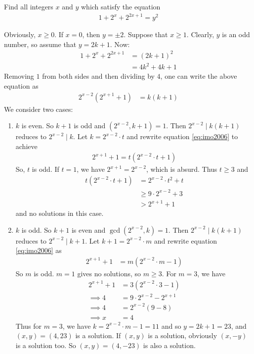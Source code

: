 \begin{problem}[IMO 2006]
	Find all integers $x$ and $y$ which satisfy the equation
		\begin{align*}
			1 + 2^x + 2^{2x + 1} = y^2
		\end{align*}
\end{problem}

\begin{solution}
	Obviously, $x \ge 0$. If $x = 0$, then $y = \pm 2$. Suppose that $x \ge 1$. Clearly, $y$ is an odd number, so assume that $y = 2k + 1$. Now:
		\begin{align*}
			1 + 2^x + 2^{2x + 1}
				& = (2k + 1)^2\\
				& = 4k^2 + 4k + 1
		\end{align*}
	Removing $1$ from both sides and then dividing by $4$, one can write the above equation as
		\begin{align}\label{eq:imo2006}
			2^{x - 2}(2^{x + 1} + 1)
				& = k(k + 1)
		\end{align}
	We consider two cases:
	\begin{enumerate}
		\item $k$ is even. So $k + 1$ is odd and $(2^{x - 2}, k + 1) = 1$. Then $2^{x - 2}\mid k(k + 1)$ reduces to $2^{x - 2}\mid k$. Let $k = 2^{x - 2} \cdot t$ and rewrite equation \eqref{eq:imo2006} to achieve
			\begin{align*}
				2^{x + 1} + 1 = t(2^{x - 2} \cdot t + 1)
			\end{align*}
		So, $t$ is odd. If $t = 1$, we have $2^{x + 1} = 2^{x - 2}$, which is absurd. Thus $t \ge 3$ and
			\begin{align*}
				t(2^{x - 2} \cdot t + 1)
					& = 2^{x - 2} \cdot t^2 + t\\
					& \ge 9 \cdot 2^{x - 2} + 3\\
					& > 2^{x + 1} + 1
			\end{align*}
		and no solutions in this case.

		\item $k$ is odd. So $k + 1$ is even and $\gcd(2^{x - 2}, k) = 1$. Then $2^{x - 2}\mid k(k + 1)$ reduces to $2^{x - 2}\mid k+1$. Let $k+1 = 2^{x - 2} \cdot m$ and rewrite equation \eqref{eq:imo2006} as
			\begin{align*}
				2^{x + 1} + 1
					& = m(2^{x - 2} \cdot m - 1)
			\end{align*}
		So $m$ is odd. $m = 1$ gives no solutions, so $m \ge 3$. For $m = 3$, we have
			\begin{align*}
				2^{x + 1} + 1
					& = 3(2^{x - 2} \cdot 3 - 1)\\
				\implies 4
					& = 9 \cdot 2^{x - 2} - 2^{x + 1} \\
				\implies 4
					& = 2^{x - 2}(9 - 8) \\
				\implies x
					& = 4
			\end{align*}
		Thus for $m = 3$, we have $k = 2^{x - 2} \cdot m - 1 = 11$ and so $y = 2k + 1 = 23$, and $(x, y) = (4, 23)$ is a solution. If $(x, y)$ is a solution, obviously $(x, -y)$ is a solution too. So $(x, y) = (4, -23)$ is also a solution.


\end{enumerate}
\end{solution}
